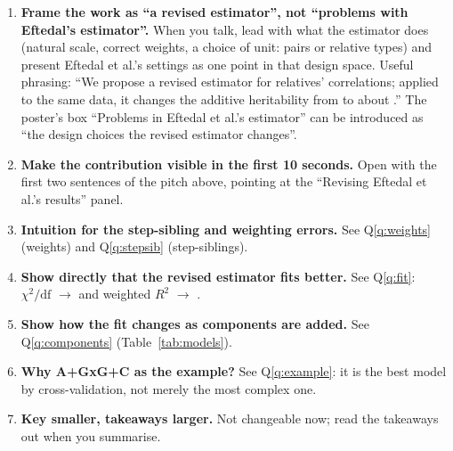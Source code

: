 \documentclass[11pt]{article}
\makeatletter
\renewcommand\section{\@startsection{section}{1}{\z@}{-2.6ex \@plus -1ex \@minus -.2ex}{1.4ex \@plus .2ex}{\color{navy}\Large\bfseries}}
\newcommand{\mAGC}{A+GxG+C}
\makeatother
\begin{document}
\begin{enumerate}[leftmargin=1.5em, itemsep=0.5em]
  \item \textbf{Frame the work as ``a revised estimator'', not ``problems with Eftedal's estimator''.}
        When you talk, lead with what the estimator does (natural scale, correct weights, a choice of unit:
        pairs or relative types) and present Eftedal et al.'s settings as one point in that design space.
        Useful phrasing: ``We propose a revised estimator for relatives' correlations; applied to the same
        data, it changes the additive heritability from \VAEft{} to about \VARevType.'' The poster's box
        ``Problems in Eftedal et al.'s estimator'' can be introduced as ``the design choices the revised
        estimator changes''.
  \item \textbf{Make the contribution visible in the first 10 seconds.} Open with the first two sentences of
        the pitch above, pointing at the ``Revising Eftedal et al.'s results'' panel.
  \item \textbf{Intuition for the step-sibling and weighting errors.} See Q\ref{q:weights} (weights) and
        Q\ref{q:stepsib} (step-siblings).
  \item \textbf{Show directly that the revised estimator fits better.} See Q\ref{q:fit}: $\chi^2/\mathrm{df}$
        \ChiDfEft{} $\to$ \ChiDfRevType{} and weighted $R^2$ \RsqEft{} $\to$ \RsqRevType.
  \item \textbf{Show how the fit changes as components are added.} See Q\ref{q:components}
        (Table~\ref{tab:models}).
  \item \textbf{Why \mAGC{} as the example?} See Q\ref{q:example}: it is the best model by cross-validation,
        not merely the most complex one.
  \item \textbf{Key smaller, takeaways larger.} Not changeable now; read the takeaways out when you summarise.
\end{enumerate}

\section{Likely questions}\label{sec:questions}

\end{document}
